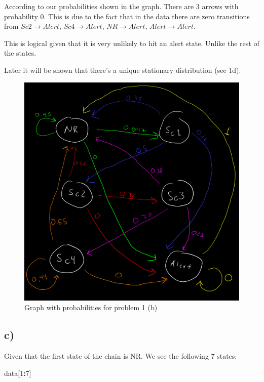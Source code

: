 \documentclass[]{article}
\newenvironment{Shaded}{\begin{snugshade}}{\end{snugshade}}
\newcommand{\DecValTok}[1]{\textcolor[rgb]{0.00,0.00,0.81}{#1}}
\newcommand{\NormalTok}[1]{#1}
\newcommand{\OperatorTok}[1]{\textcolor[rgb]{0.81,0.36,0.00}{\textbf{#1}}}
\begin{document}
According to our probabilities shown in the graph. There are 3 arrows
with probability 0. This is due to the fact that in the data there are
zero transitions from \(Sc2 \rightarrow Alert\),
\(Sc4 \rightarrow Alert\), \(NR \rightarrow Alert\),
\(Alert \rightarrow Alert\).

This is logical given that it is very unlikely to hit an alert state.
Unlike the rest of the states.

Later it will be shown that there's a unique stationary distribution
(see 1d).

\begin{figure}
\centering
\includegraphics{./grafo1_probs.png}
\caption{Graph with probabilities for problem 1 (b)}
\end{figure}

\newpage

\hypertarget{c}{%
\subsection{c)}\label{c}}

Given that the first state of the chain is NR. We see the following 7
states:

\begin{Shaded}
\begin{Highlighting}[]
\NormalTok{data[}\DecValTok{1}\OperatorTok{:}\DecValTok{7}\NormalTok{]}
\end{Highlighting}
\end{Shaded}
\end{document}
